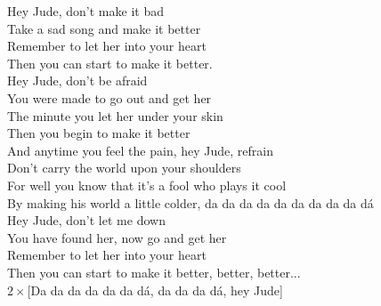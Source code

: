 
Hey Jude, don't make it bad\\
Take a sad song and make it better\\
Remember to let her into your heart\\
Then you can start to make it better.\\

Hey Jude, don't be afraid\\
You were made to go out and get her\\
The minute you let her under your skin\\
Then you begin to make it better\\

And anytime you feel the pain, hey Jude, refrain \\
Don't carry the world upon your shoulders\\
For well you know that it's a fool who plays it cool\\
By making his world a little colder, da da da da da da da da da dá\\

Hey Jude, don't let me down\\
You have found her, now go and get her\\
Remember to let her into your heart\\
Then you can start to make it better, better, better...\\

$2 \times$[Da da da da da da dá, da da da dá, hey Jude]

\newpage
